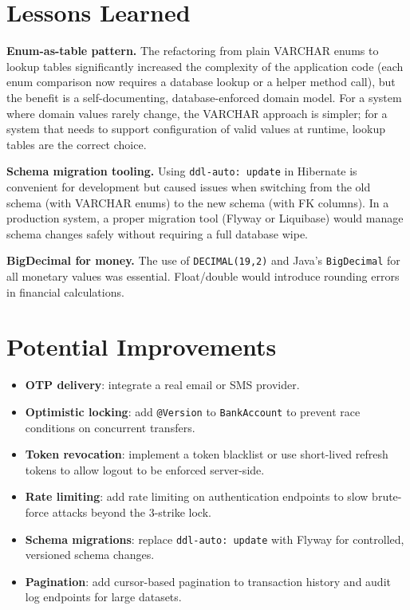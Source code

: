 \documentclass[12pt,a4paper]{report}
\begin{document}
\section{Lessons Learned}

\textbf{Enum-as-table pattern.} The refactoring from plain VARCHAR enums to lookup
tables significantly increased the complexity of the application code (each enum
comparison now requires a database lookup or a helper method call), but the benefit
is a self-documenting, database-enforced domain model. For a system where domain values
rarely change, the VARCHAR approach is simpler; for a system that needs to support
configuration of valid values at runtime, lookup tables are the correct choice.

\textbf{Schema migration tooling.} Using \texttt{ddl-auto: update} in Hibernate is
convenient for development but caused issues when switching from the old schema (with
VARCHAR enums) to the new schema (with FK columns). In a production system, a proper
migration tool (Flyway or Liquibase) would manage schema changes safely without
requiring a full database wipe.

\textbf{BigDecimal for money.} The use of \texttt{DECIMAL(19,2)} and Java's
\texttt{BigDecimal} for all monetary values was essential. Float/double would introduce
rounding errors in financial calculations.

\section{Potential Improvements}

\begin{itemize}[noitemsep]
  \item \textbf{OTP delivery}: integrate a real email or SMS provider.
  \item \textbf{Optimistic locking}: add \texttt{@Version} to \texttt{BankAccount}
        to prevent race conditions on concurrent transfers.
  \item \textbf{Token revocation}: implement a token blacklist or use short-lived
        refresh tokens to allow logout to be enforced server-side.
  \item \textbf{Rate limiting}: add rate limiting on authentication endpoints to
        slow brute-force attacks beyond the 3-strike lock.
  \item \textbf{Schema migrations}: replace \texttt{ddl-auto: update} with Flyway
        for controlled, versioned schema changes.
  \item \textbf{Pagination}: add cursor-based pagination to transaction history
        and audit log endpoints for large datasets.
\end{itemize}
\end{document}
